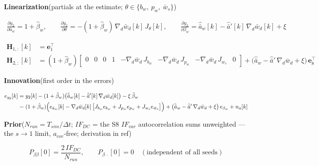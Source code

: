 \textbf{Linearization}\quad (partials at the estimate;
$\theta \in \{b_w,\ p_w,\ \bar{w}_s\}$)

\begin{align*}
\frac{\partial y_2}{\partial \bar{a}_w} = 1+\hat{\beta}_w,
\qquad
\frac{\partial y_2}{\partial \theta}
  = -(1+\hat{\beta}_w)\,\nabla_d\bar{w}_d[k]\,J_{\theta}[k],
\qquad
\frac{\partial y_2}{\partial \beta_w}
  = \hat{\bar{a}}_w[k] - \hat{\bar{a}}'[k]\,\nabla_d\bar{w}_d[k] + \xi
\end{align*}

\begin{align*}
\mathbf{H}_{1,:}[k] &= \mathbf{e}_1^{\top} \\
\mathbf{H}_{2,:}[k] &= (1+\hat{\beta}_w)
\begin{bmatrix}
0 & 0 & 0 & 1 &
-\nabla_d\bar{w}_d\,J_{b_w} &
-\nabla_d\bar{w}_d\,J_{p_w} &
-\nabla_d\bar{w}_d\,J_{w_s} & 0
\end{bmatrix}
+ \bigl(\hat{\bar{a}}_w - \hat{\bar{a}}'\,\nabla_d\bar{w}_d + \xi\bigr)\,
  \mathbf{e}_8^{\top}
\end{align*}

\textbf{Innovation}\quad (first order in the errors)

\begin{align*}
e_{y_2}[k]
  &= y_2[k] - (1+\hat{\beta}_w)\bigl(\hat{\bar{a}}_w[k]
     - \hat{\bar{a}}'[k]\,\nabla_d\bar{w}_d[k]\bigr)
     - \xi\,\hat{\beta}_w \\
  &= (1+\hat{\beta}_w)\Bigl(e_{\bar{a}_w}[k]
     - \nabla_d\bar{w}_d[k]\,
       \bigl[J_{b_w}e_{b_w} + J_{p_w}e_{p_w}
       + J_{w_s}e_{\bar{w}_s}\bigr]\Bigr)
   + \bigl(\hat{\bar{a}}_w - \hat{\bar{a}}'\,\nabla_d\bar{w}_d + \xi\bigr)\,
     e_{\beta_w}
   + n_a[k]
\end{align*}

\textbf{Prior}\quad ($N_{run} = T_{sim}/\Delta t$; $IF_{DC}$ = the S8
$IF_{var}$ autocorrelation sums unweighted --- the $s \to 1$ limit,
$a_{cov}$-free; derivation in ref)

\begin{equation*}
P_{\beta\beta}[0] = \frac{2\,IF_{DC}}{N_{run}},
\qquad
P_{\beta\,\cdot}[0] = 0 \quad
(\text{independent of all seeds})
\end{equation*}

